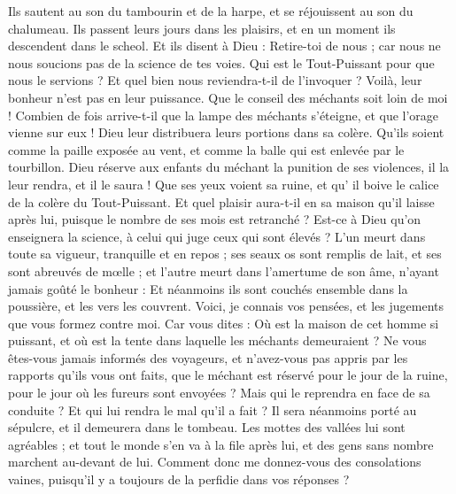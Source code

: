 \begin{multicols}{2}
Ils sautent au son du tambourin et de la harpe, et se réjouissent au son du chalumeau. 
Ils passent leurs jours dans les plaisirs, et en un moment ils descendent dans le scheol.
 Et ils disent à Dieu : Retire-toi de nous ; car nous ne nous soucions pas de la science de tes voies. 
Qui est le Tout-Puissant pour que nous le servions ? Et quel bien nous reviendra-t-il de l'invoquer ?
Voilà, leur bonheur n'est pas en leur puissance. Que le conseil des méchants soit loin de moi !
Combien de fois arrive-t-il que la lampe des méchants s'éteigne, et que l'orage vienne sur eux ! Dieu leur distribuera leurs portions dans sa colère.
Qu'ils soient comme la paille exposée au vent, et comme la balle qui est enlevée par le tourbillon.
Dieu réserve aux enfants du méchant la punition de ses violences, il la leur rendra, et il le saura !
Que ses yeux voient sa ruine, et qu' il boive le calice de la colère du Tout-Puissant.
Et quel plaisir aura-t-il en sa maison qu'il laisse après lui, puisque le nombre de ses mois est retranché ? 
Est-ce à Dieu qu'on enseignera la science, à celui qui juge ceux qui sont élevés ?
L'un meurt dans toute sa vigueur, tranquille et en repos ; 
ses seaux os sont remplis de lait, et ses sont abreuvés de mœlle ; 
et l'autre meurt dans l'amertume de son âme, n'ayant jamais goûté le bonheur : 
Et néanmoins ils sont couchés ensemble dans la poussière, et les vers les couvrent. 
Voici, je connais vos pensées, et les jugements que vous formez contre moi. 
Car vous dites : Où est la maison de cet homme si puissant, et où est la tente dans laquelle les méchants demeuraient ?
Ne vous êtes-vous jamais informés des voyageurs, et n'avez-vous pas appris par les rapports qu'ils vous ont faits,
que le méchant est réservé pour le jour de la ruine, pour le jour où les fureurs sont envoyées ?
Mais qui le reprendra en face de sa conduite ? Et qui lui rendra le mal qu'il a fait ?
Il sera néanmoins porté au sépulcre, et il demeurera dans le tombeau.
Les mottes des vallées lui sont agréables ; et tout le monde s'en va à la file après lui, et des gens sans nombre marchent au-devant de lui. 
Comment donc me donnez-vous des consolations vaines, puisqu'il y a toujours de la perfidie dans vos réponses ?

\end{multicols}
